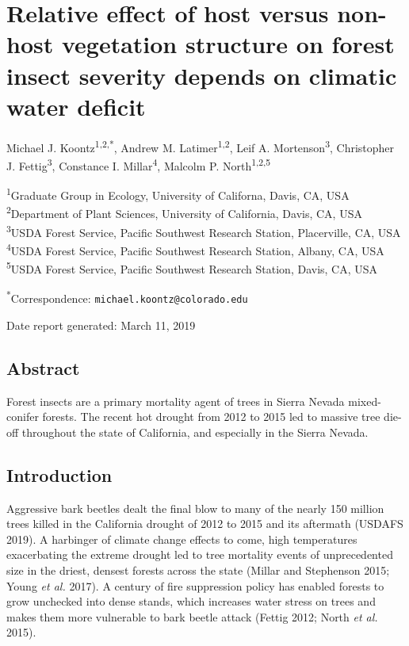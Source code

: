 \documentclass[]{article}
\title{}
\author{}
\date{}
\begin{document}
\section{Relative effect of host versus non-host vegetation structure on
forest insect severity depends on climatic water
deficit}\label{relative-effect-of-host-versus-non-host-vegetation-structure-on-forest-insect-severity-depends-on-climatic-water-deficit}

Michael J. Koontz\textsuperscript{1,2,*}, Andrew M.
Latimer\textsuperscript{1,2}, Leif A. Mortenson\textsuperscript{3},
Christopher J. Fettig\textsuperscript{3}, Constance I.
Millar\textsuperscript{4}, Malcolm P. North\textsuperscript{1,2,5}

\textsuperscript{1}Graduate Group in Ecology, University of Californa,
Davis, CA, USA\\
\textsuperscript{2}Department of Plant Sciences, University of
California, Davis, CA, USA\\
\textsuperscript{3}USDA Forest Service, Pacific Southwest Research
Station, Placerville, CA, USA\\
\textsuperscript{4}USDA Forest Service, Pacific Southwest Research
Station, Albany, CA, USA\\
\textsuperscript{5}USDA Forest Service, Pacific Southwest Research
Station, Davis, CA, USA

\textsuperscript{*}Correspondence: \texttt{michael.koontz@colorado.edu}

Date report generated: March 11, 2019

\subsection{Abstract}\label{abstract}

Forest insects are a primary mortality agent of trees in Sierra Nevada
mixed-conifer forests. The recent hot drought from 2012 to 2015 led to
massive tree die-off throughout the state of California, and especially
in the Sierra Nevada.

\subsection{Introduction}\label{introduction}

Aggressive bark beetles dealt the final blow to many of the nearly 150
million trees killed in the California drought of 2012 to 2015 and its
aftermath (USDAFS 2019). A harbinger of climate change effects to come,
high temperatures exacerbating the extreme drought led to tree mortality
events of unprecedented size in the driest, densest forests across the
state (Millar and Stephenson 2015; Young \emph{et al.} 2017). A century
of fire suppression policy has enabled forests to grow unchecked into
dense stands, which increases water stress on trees and makes them more
vulnerable to bark beetle attack (Fettig 2012; North \emph{et al.}
2015).
\end{document}
